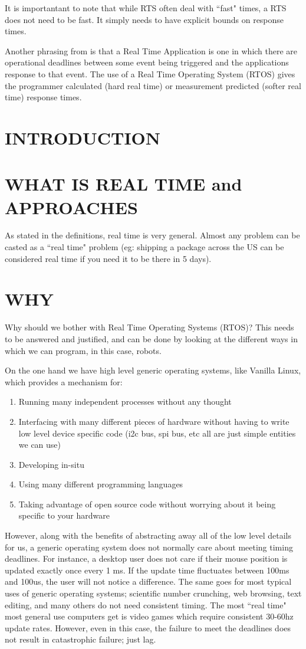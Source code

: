 \documentclass{article}
\begin{document}
It is importantant to note that while RTS often deal with ``fast" times, a RTS does not need to be fast.  It simply needs to have explicit bounds on response times.

Another phrasing from \cite{RealTimeLinux} is that a Real Time Application is one in which there are operational deadlines between some event being triggered and the applications response to that event.  The use of a Real Time Operating System (RTOS) gives the programmer calculated (hard real time) or measurement predicted (softer real time) response times.

\section{INTRODUCTION}
\section{WHAT IS REAL TIME and APPROACHES}
As stated in the definitions, real time is very general.  Almost any problem can be casted as a ``real time" problem (eg: shipping a package across the US can be considered real time if you need it to be there in 5 days).  
\section{WHY}
Why should we bother with Real Time Operating Systems (RTOS)?  This needs to be answered and justified, and can be done by looking at the different ways in which we can program, in this case, robots.  

On the one hand we have high level generic operating systems, like Vanilla Linux, which provides a mechanism for:
\begin{enumerate}
\item Running many independent processes without any thought
\item Interfacing with many different pieces of hardware without having to write low level device specific code (i2c bus, spi bus, etc all are just simple entities we can use)
\item Developing in-situ
\item Using many different programming languages
\item Taking advantage of open source code without worrying about it being specific to your hardware 
\end{enumerate}

However, along with the benefits of abstracting away all of the low level details for us, a generic operating system does not normally care about meeting timing deadlines.  For instance, a desktop user does not care if their mouse position is updated exactly once every 1 ms.  If the update time fluctuates between 100ms and 100us, the user will not notice a difference.  The same goes for most typical uses of generic operating systems; scientific number crunching, web browsing, text editing, and many others do not need consistent timing.  The most ``real time" most general use computers get is video games which require consistent 30-60hz update rates.  However, even in this case, the failure to meet the deadlines does not result in catastrophic failure; just lag.
\end{document}
